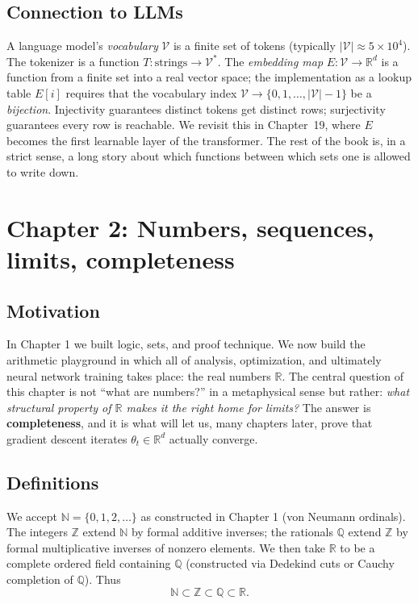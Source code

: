 \documentclass[11pt]{article}
\theoremstyle{remark}
\begin{document}
\subsection*{Connection to LLMs}

A language model's \emph{vocabulary} $\mathcal{V}$ is a finite set of tokens (typically $|\mathcal{V}| \approx 5 \times 10^{4}$). The tokenizer is a function $T : \text{strings} \to \mathcal{V}^{*}$. The \emph{embedding map} $E : \mathcal{V} \to \mathbb{R}^{d}$ is a function from a finite set into a real vector space; the implementation as a lookup table $E[i]$ requires that the vocabulary index $\mathcal{V} \to \{0, 1, \ldots, |\mathcal{V}|-1\}$ be a \emph{bijection}. Injectivity guarantees distinct tokens get distinct rows; surjectivity guarantees every row is reachable. We revisit this in Chapter~19, where $E$ becomes the first learnable layer of the transformer. The rest of the book is, in a strict sense, a long story about which functions between which sets one is allowed to write down.


\section*{Chapter 2: Numbers, sequences, limits, completeness}

\subsection*{Motivation}

In Chapter 1 we built logic, sets, and proof technique. We now build the arithmetic playground in which all of analysis, optimization, and ultimately neural network training takes place: the real numbers $\mathbb{R}$. The central question of this chapter is not ``what are numbers?'' in a metaphysical sense but rather: \emph{what structural property of $\mathbb{R}$ makes it the right home for limits?} The answer is \textbf{completeness}, and it is what will let us, many chapters later, prove that gradient descent iterates $\theta_t \in \mathbb{R}^d$ actually converge.

\subsection*{Definitions}

We accept $\mathbb{N} = \{0, 1, 2, \ldots\}$ as constructed in Chapter 1 (von Neumann ordinals). The integers $\mathbb{Z}$ extend $\mathbb{N}$ by formal additive inverses; the rationals $\mathbb{Q}$ extend $\mathbb{Z}$ by formal multiplicative inverses of nonzero elements. We then take $\mathbb{R}$ to be a complete ordered field containing $\mathbb{Q}$ (constructed via Dedekind cuts or Cauchy completion of $\mathbb{Q}$). Thus
\[
\mathbb{N} \subset \mathbb{Z} \subset \mathbb{Q} \subset \mathbb{R}.
\]
\end{document}

